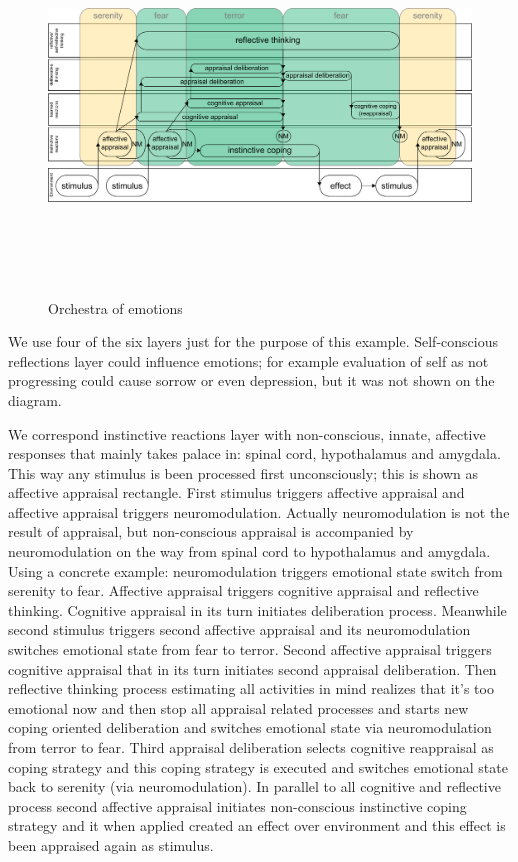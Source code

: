 \begin{figure}
\begin{center}
 \includegraphics[height=10cm, angle=90]{figure2_orchestra_of_emotions}
\end{center}
\caption{Orchestra of emotions}
\end{figure}

We use four of the six layers just for the purpose of this example. Self-conscious reflections layer could influence emotions; for example evaluation of self as not progressing could cause sorrow or even depression, but it was not shown on the diagram.

We correspond instinctive reactions layer with non-conscious, innate, affective responses that mainly takes palace in: spinal cord, hypothalamus and amygdala. This way any stimulus is been processed first unconsciously; this is shown as affective appraisal rectangle. First stimulus triggers affective appraisal and affective appraisal triggers neuromodulation. Actually neuromodulation is not the result of appraisal, but non-conscious appraisal is accompanied by neuromodulation on the way from spinal cord to hypothalamus and amygdala.
Using a concrete example: neuromodulation triggers emotional state switch from serenity to fear. Affective appraisal triggers cognitive appraisal and reflective thinking. Cognitive appraisal in its turn initiates deliberation process. Meanwhile second stimulus triggers second affective appraisal and its neuromodulation switches emotional state from fear to terror. Second affective appraisal triggers cognitive appraisal that in its turn initiates second appraisal deliberation. Then reflective thinking process estimating all activities in mind realizes that it's too emotional now and then stop all appraisal related processes and starts new coping oriented deliberation and switches emotional state via neuromodulation from terror to fear. Third appraisal deliberation selects cognitive reappraisal as coping strategy and this coping strategy is executed and switches emotional state back to serenity (via neuromodulation).
In parallel to all cognitive and reflective process second affective appraisal initiates non-conscious instinctive coping strategy and it when applied created an effect over environment and this effect is been appraised again as stimulus.

